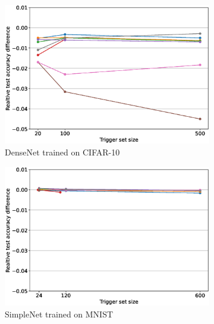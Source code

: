 \begin{figure}
    \centering
    \begin{subfigure}{0.4\linewidth}
        \includegraphics[width=\linewidth]{images/fidelity/densenet_fidelity_rel_per_arch.eps}
        \caption{DenseNet trained on CIFAR-10}
        \label{fig:fidelity-densenet}
    \end{subfigure}
    \quad
    \begin{subfigure}{0.4\linewidth}
        \includegraphics[width=\linewidth]{images/fidelity/simplenet_mnist_fidelity_rel_per_arch.eps}
        \caption{SimpleNet trained on MNIST}
        \label{fig:fidelity-simplenet_mnist}
    \end{subfigure}
    \quad
    \begin{subfigure}{0.4\linewidth}

\end{subfigure}
\end{figure}
